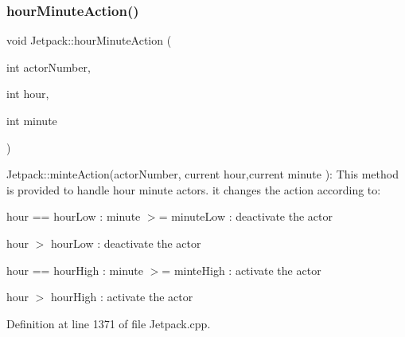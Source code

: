\subsubsection{\texorpdfstring{hour\+Minute\+Action()}{hourMinuteAction()}}
{\footnotesize\ttfamily void Jetpack\+::hour\+Minute\+Action (\begin{DoxyParamCaption}\item[{int}]{actor\+Number,  }\item[{int}]{hour,  }\item[{int}]{minute }\end{DoxyParamCaption})}

Jetpack\+::minte\+Action(actor\+Number, current hour,current minute )\+: This method is provided to handle hour minute actors. it changes the action according to\+:

hour == hour\+Low \+: minute $>$= minute\+Low \+: deactivate the actor

hour $>$ hour\+Low \+: deactivate the actor

hour == hour\+High \+: minute $>$= minte\+High \+: activate the actor

hour $>$ hour\+High \+: activate the actor 

Definition at line 1371 of file Jetpack.\+cpp.


